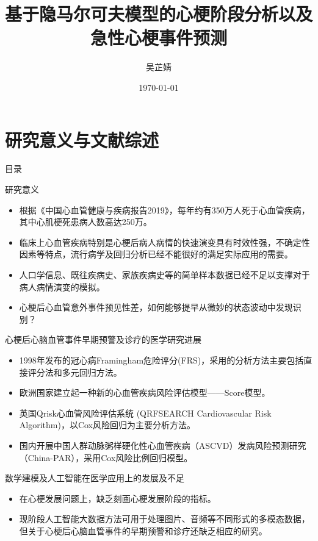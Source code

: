 \documentclass{beamer}
\date{{\today}}
\begin{document}
\begin{frame}
	\title{基于隐马尔可夫模型的心梗阶段分析以及急性心梗事件预测}
	\author{
吴芷婧} %
	\date{ }  %
\titlepage
\end{frame}

\section{研究意义与文献综述}
\begin{frame}{目录}
\tableofcontents[sectionstyle=show/shaded,subsectionstyle=show/shaded/hide]
\end{frame}

\begin{frame}{研究意义}
\begin{itemize}
		\item 根据《中国心血管健康与疾病报告2019》，每年约有350万人死于心血管疾病，其中心肌梗死患病人数高达250万。
		\item 临床上心血管疾病特别是心梗后病人病情的快速演变具有时效性强，不确定性因素等特点，流行病学及回归分析已经不能很好的满足实际应用的需要。
		\item
		人口学信息、既往疾病史、家族疾病史等的简单样本数据已经不足以支撑对于病人病情演变的模拟。
		\item
        心梗后心血管意外事件预见性差，如何能够提早从微妙的状态波动中发现识别？
	\end{itemize}
\end{frame}


\begin{frame}{心梗后心脑血管事件早期预警及诊疗的医学研究进展}
\begin{itemize}
		\item 
    1998年发布的冠心病Framingham危险评分(FRS)，采用的分析方法主要包括直接评分法和多元回归方法。
		\item
		欧洲国家建立起一种新的心血管疾病风险评估模型——Score模型。
		\item
		英国Qrisk心血管风险评估系统 (QRFSEARCH Cardiovascular Risk Algorithm)，以Cox风险回归为主要分析方法。
		\item
		国内开展中国人群动脉粥样硬化性心血管疾病（ASCVD）发病风险预测研究（China-PAR），采用Cox风险比例回归模型。
	\end{itemize}
\end{frame}

\begin{frame}{数学建模及人工智能在医学应用上的发展及不足}
\begin{itemize}
		\item 
		在心梗发展问题上，缺乏刻画心梗发展阶段的指标。
		\item
		现阶段人工智能大数据方法可用于处理图片、音频等不同形式的多模态数据，但关于心梗后心脑血管事件的早期预警和诊疗还缺乏相应的研究。
	\end{itemize}
\end{frame}
\end{document}
